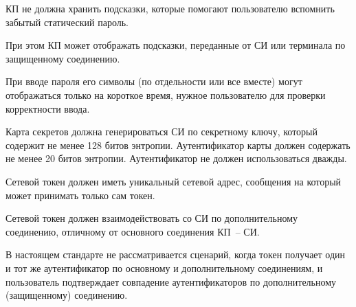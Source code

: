 КП не должна хранить подсказки, которые помогают пользователю вспомнить забытый 
статический пароль.


\begin{note*}
При этом КП может отображать подсказки, переданные от СИ или терминала 
по защищенному соединению.
\end{note*}

При вводе пароля его символы (по отдельности или все вместе)
могут отображаться только на короткое время,
нужное пользователю для проверки корректности ввода.


Карта секретов должна генерироваться СИ по секретному ключу, который содержит 
не менее 128 битов энтропии.
%
Аутентификатор карты должен содержать не менее 20 битов энтропии. 
%
Аутентификатор не должен использоваться дважды. 



Сетевой токен должен иметь уникальный сетевой адрес,
сообщения на который может принимать только сам токен.

\begin{note*}
\end{note*}

Сетевой токен должен взаимодействовать со СИ по дополнительному соединению, 
отличному от основного соединения КП~-- СИ. 

\begin{note*}
В настоящем стандарте не рассматривается сценарий, когда токен получает
один и тот же аутентификатор по основному и дополнительному соединениям,
и пользователь подтверждает совпадение аутентификаторов по дополнительному 
(защищенному) соединению.
\end{note*}

